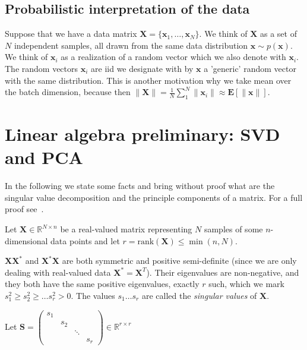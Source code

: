 \documentclass[11pt, a4paper]{report}
\theoremstyle{plain}
\theoremstyle{definition}
\theoremstyle{remark}
\newcommand{\R}{\mathbb{R}}
\newcommand{\E}{\mathbf{E}}
\newcommand{\X}{\mathbf{X}}
\newcommand{\x}{\mathbf{x}}
\newcommand{\Y}{\mathbf{Y}}
\newcommand{\bv}[1]{\boldsymbol{#1}}
\newcommand{\gt}{>}
\begin{document}


\subsection{Probabilistic interpretation of the data}
Suppose that we have a data matrix $\X = \{\x_1, \dots , \x_N\}$. We think of
$\X$ as a set of $N$ independent samples, all drawn from the same data
distribution $\x \sim p(\x)$. We think of $\x_i$ as a realization of a random
vector which we also denote with $\x_i$. The random vectors $\x_i$ are
iid we designate with by $\x$ a 'generic' random vector with the same
distribution. This is another motivation why
we take mean over the batch dimension, because then $\|\X\| = \frac{1}{N}
\sum_1^N \|\x_i\| \approx \E [\|\x\|]$.


\section{Linear algebra preliminary: SVD and PCA}
In the following we state some facts and bring without proof what are the singular
value decomposition and the principle components of a matrix. For a full proof
see~\cite{serre2001matrices}.

Let $\bv{X} \in \R^{N \times n}$ be a real-valued matrix representing $N$
samples of some $n$-dimensional data points and let $r= \text{rank}(\bv{X}) \leq
\min(n,N)$. 

$\X \X^*$ and $\X^* \X$ are both symmetric and positive semi-definite
(since we are only dealing with real-valued data $\X^* = \X^T$). Their
eigenvalues are non-negative, and they both have the same positive eigenvalues,
exactly $r$ such, which we mark $s_1^2 \geq s_2^2 \geq \dots s_r^2 \gt 0$. The
values $s_1 \dots s_r$ are called the \emph{singular values} of $\bv{X}$.

Let $\bv{S} = 
\begin{pmatrix}
s_1 & & &\\
& s_2 & &\\
& & \ddots &\\
& & & s_r
\end{pmatrix} \in \R^{r \times r}
$
\end{document}
